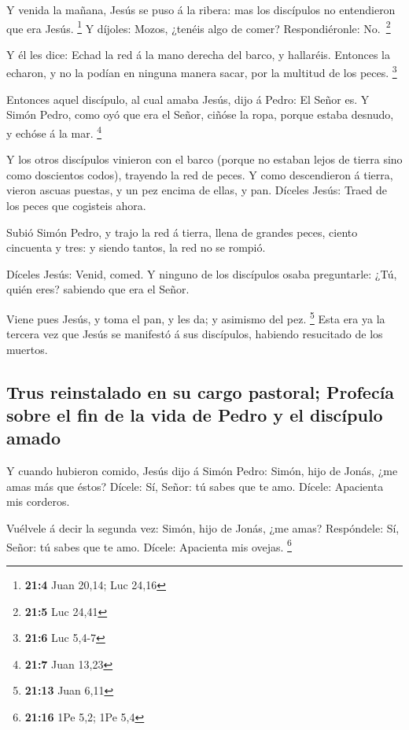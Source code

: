  Y venida la mañana, Jesús se puso á la ribera: mas los
discípulos no entendieron que era Jesús. \footnote{\textbf{21:4} Juan
  20,14; Luc 24,16}  Y díjoles: Mozos, ¿tenéis algo de
comer? Respondiéronle: No.~\footnote{\textbf{21:5} Luc 24,41}

 Y él les dice: Echad la red á la mano derecha del barco, y
hallaréis. Entonces la echaron, y no la podían en ninguna manera sacar,
por la multitud de los peces. \footnote{\textbf{21:6} Luc 5,4-7}

 Entonces aquel discípulo, al cual amaba Jesús, dijo á
Pedro: El Señor es. Y Simón Pedro, como oyó que era el Señor, ciñóse la
ropa, porque estaba desnudo, y echóse á la mar. \footnote{\textbf{21:7}
  Juan 13,23}

 Y los otros discípulos vinieron con el barco (porque no
estaban lejos de tierra sino como doscientos codos), trayendo la red de
peces.  Y como descendieron á tierra, vieron ascuas puestas,
y un pez encima de ellas, y pan.  Díceles Jesús: Traed de
los peces que cogisteis ahora.

 Subió Simón Pedro, y trajo la red á tierra, llena de
grandes peces, ciento cincuenta y tres: y siendo tantos, la red no se
rompió.

 Díceles Jesús: Venid, comed. Y ninguno de los discípulos
osaba preguntarle: ¿Tú, quién eres? sabiendo que era el Señor.

 Viene pues Jesús, y toma el pan, y les da; y asimismo del
pez. \footnote{\textbf{21:13} Juan 6,11}  Esta era ya la
tercera vez que Jesús se manifestó á sus discípulos, habiendo resucitado
de los muertos.

\hypertarget{trus-reinstalado-en-su-cargo-pastoral-profecuxeda-sobre-el-fin-de-la-vida-de-pedro-y-el-discuxedpulo-amado}{%
\subsection{Trus reinstalado en su cargo pastoral; Profecía sobre el fin
de la vida de Pedro y el discípulo
amado}\label{trus-reinstalado-en-su-cargo-pastoral-profecuxeda-sobre-el-fin-de-la-vida-de-pedro-y-el-discuxedpulo-amado}}

 Y cuando hubieron comido, Jesús dijo á Simón Pedro: Simón,
hijo de Jonás, ¿me amas más que éstos? Dícele: Sí, Señor: tú sabes que
te amo. Dícele: Apacienta mis corderos.

 Vuélvele á decir la segunda vez: Simón, hijo de Jonás, ¿me
amas? Respóndele: Sí, Señor: tú sabes que te amo. Dícele: Apacienta mis
ovejas. \footnote{\textbf{21:16} 1Pe 5,2; 1Pe 5,4}

